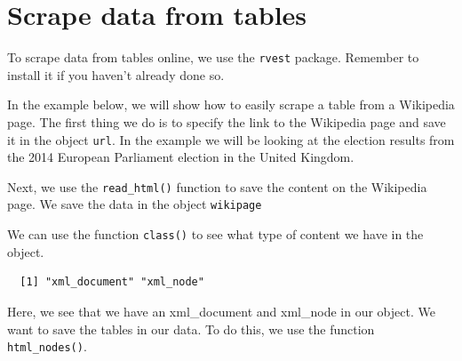 \documentclass[12pt,oneside]{reedthesis}
\theoremstyle{definition}
\theoremstyle{definition}
\theoremstyle{definition}
\theoremstyle{remark}
\begin{document}
  \section{Scrape data from tables}\label{scrape-data-from-tables}
  
  To scrape data from tables online, we use the \texttt{rvest} package.
  Remember to install it if you haven't already done so.
  \begin{Shaded}
  \begin{Highlighting}[]
  \NormalTok{(}\NormalTok{)}
  \end{Highlighting}
  \end{Shaded}
  In the example below, we will show how to easily scrape a table from a
  Wikipedia page. The first thing we do is to specify the link to the
  Wikipedia page and save it in the object \texttt{url}. In the example we
  will be looking at the election results from the 2014 European
  Parliament election in the United Kingdom.
  \begin{Shaded}
  \begin{Highlighting}[]
  \StringTok{ }\NormalTok{(}
  \NormalTok{  )}
  \end{Highlighting}
  \end{Shaded}
  Next, we use the \texttt{read\_html()} function to save the content on
  the Wikipedia page. We save the data in the object \texttt{wikipage}
  \begin{Shaded}
  \begin{Highlighting}[]
  \StringTok{ }
  \end{Highlighting}
  \end{Shaded}
  We can use the function \texttt{class()} to see what type of content we
  have in the object.
  \begin{Shaded}
  \begin{Highlighting}[]
  \end{Highlighting}
  \end{Shaded}
  \begin{verbatim}
  [1] "xml_document" "xml_node"    
  \end{verbatim}
  Here, we see that we have an xml\_document and xml\_node in our object.
  We want to save the tables in our data. To do this, we use the function
  \texttt{html\_nodes()}.
\end{document}
